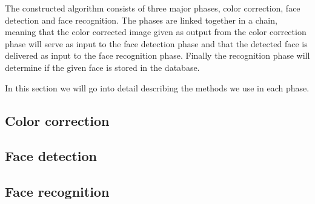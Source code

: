 The constructed algorithm consists of three major phases, color correction, face detection and face recognition. The phases are linked together in a chain, meaning that the color corrected image given as output from the color correction phase will serve as input to the face detection phase and that the detected face is delivered as input to the face recognition phase. Finally the recognition phase will determine if the given face is stored in the database.

In this section we will go into detail describing the methods we use in each phase.



\subsection{Color correction}


\subsection{Face detection}


\subsection{Face recognition}

